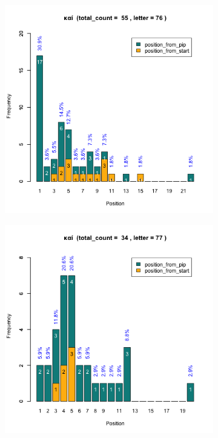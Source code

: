 \documentclass[a4paper]{article}
\begin{document}
\begin{figure}
\begin{subfigure}{0.45\textwidth}
\end{subfigure}
\begin{subfigure}{0.45\textwidth}
\centering
\includegraphics[width=1\linewidth]{../../data/output/paul_R_par/plots/par3_lt76.png}
\end{subfigure}
\begin{subfigure}{0.45\textwidth}
\centering
\includegraphics[width=1\linewidth]{../../data/output/paul_R_par/plots/par3_lt77.png}
\end{subfigure}
\end{figure}
\end{document}
